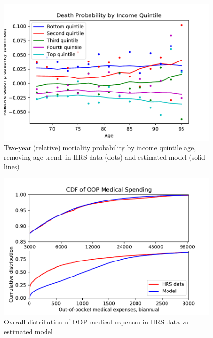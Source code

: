 \documentclass[12pt,pdftex,letterpaper]{article}
\begin{document}
\begin{figure}[h!]
\begin{center}
\includegraphics[scale=0.9]{../Figures/MortByIncAge.pdf}
\end{center}
\vspace{-0.5cm}
\caption{Two-year (relative) mortality probability by income quintile age, removing age trend, in HRS data (dots) and estimated model (solid lines)}
\label{fig:MortByIncAge}
\end{figure}


\newpage

\begin{figure}[h!]
\begin{center}
\includegraphics[scale=0.9]{../Figures/OOPdistribution.pdf}
\end{center}
\vspace{-0.5cm}
\caption{Overall distribution of OOP medical expenses in HRS data vs estimated model}
\label{fig:OOPdistribution}
\end{figure}
\end{document}
